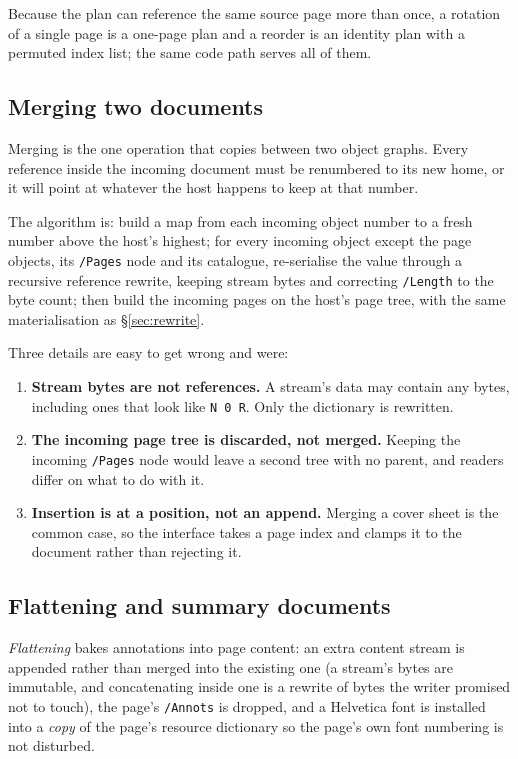 Because the plan can reference the same source page more than once, a rotation of a single
page is a one-page plan and a reorder is an identity plan with a permuted index list; the same
code path serves all of them.

\subsection{Merging two documents}
\label{sec:merge}

Merging is the one operation that copies between two object graphs. Every reference inside the
incoming document must be renumbered to its new home, or it will point at whatever the host
happens to keep at that number.

The algorithm is: build a map from each incoming object number to a fresh number above the
host's highest; for every incoming object except the page objects, its \texttt{/Pages} node
and its catalogue, re-serialise the value through a recursive reference rewrite, keeping
stream bytes and correcting \texttt{/Length} to the byte count; then build the incoming pages
on the host's page tree, with the same materialisation as \S\ref{sec:rewrite}.

Three details are easy to get wrong and were:

\begin{enumerate}
  \item \textbf{Stream bytes are not references.} A stream's data may contain any bytes,
        including ones that look like \texttt{N 0 R}. Only the dictionary is rewritten.
  \item \textbf{The incoming page tree is discarded, not merged.} Keeping the incoming
        \texttt{/Pages} node would leave a second tree with no parent, and readers differ on
        what to do with it.
  \item \textbf{Insertion is at a position, not an append.} Merging a cover sheet is the
        common case, so the interface takes a page index and clamps it to the document rather
        than rejecting it.
\end{enumerate}

\subsection{Flattening and summary documents}

\emph{Flattening} bakes annotations into page content: an extra content stream is appended
rather than merged into the existing one (a stream's bytes are immutable, and concatenating
inside one is a rewrite of bytes the writer promised not to touch), the page's
\texttt{/Annots} is dropped, and a Helvetica font is installed into a \emph{copy} of the
page's resource dictionary so the page's own font numbering is not disturbed.

